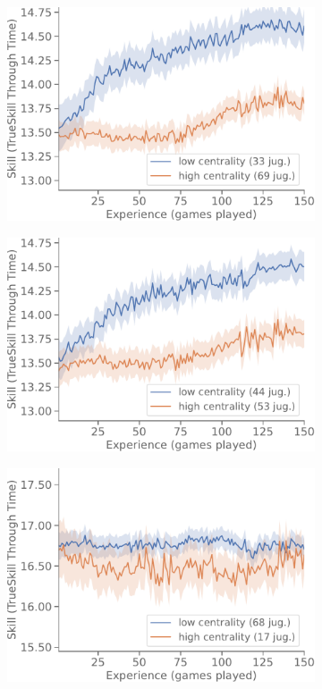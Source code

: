 \documentclass[a4paper,11pt]{book}
\theoremstyle{definition}
\begin{document}
\begin{figure}[ht!]
\begin{subfigure}[t]{0.32\textwidth}
	\includegraphics[width=\linewidth]{static/paper/evolucion-ttt-inicial-med-harmonic-centrality-inverse-weight}
	\end{subfigure}
	\begin{subfigure}[t]{0.32\textwidth}\centering
	\includegraphics[width=\linewidth]{static/paper/evolucion-ttt-inicial-med-load-centrality}
	\end{subfigure}
    \begin{subfigure}[t]{0.32\textwidth}\centering
	\includegraphics[width=\linewidth]{static/paper/evolucion-ttt-inicial-high-eigenvector-centrality}

\end{subfigure}
\end{figure}
\end{document}
